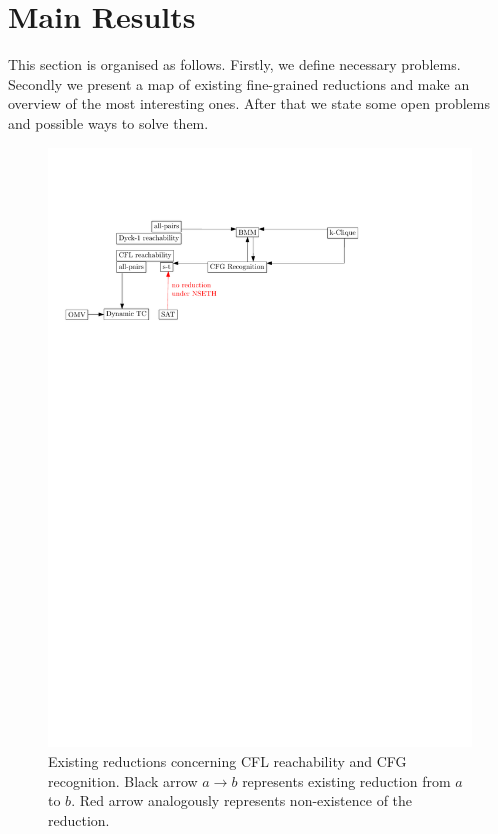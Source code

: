 \documentclass[acmsmall,review,nonacm]{acmart}\settopmatter{printfolios=true,printccs=false,printacmref=false}
\begin{document}
	
	\section{Main Results}
	
	This section is organised as follows. Firstly, we define necessary problems. Secondly we present a map of existing fine-grained reductions and make an overview of the most interesting ones. After that we state some open problems and possible ways to solve them. 
	
	\begin{figure}[!htp]
		
		\begin{center}  
			\includegraphics[scale = 0.8]{map_popl.pdf}
		\end{center}
	
		\caption{Existing reductions concerning CFL reachability and CFG recognition. Black arrow $a \rightarrow b$ represents existing reduction from $a$ to $b$. Red arrow analogously represents non-existence of the reduction. }
		
	\end{figure}
	
\end{document}
